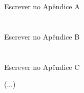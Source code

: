 




\chapter{}

Escrever no Apêndice A

\clearpage

\chapter{}

Escrever no Apêndice B

\clearpage

\chapter{}

Escrever no Apêndice C

(...)

